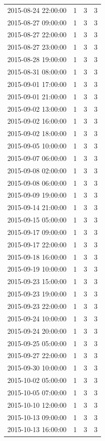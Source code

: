 \begin{tabular}{lrrr}
2015-08-24 22:00:00 & 1 & 3 & 3 \\
2015-08-27 09:00:00 & 1 & 3 & 3 \\
2015-08-27 22:00:00 & 1 & 3 & 3 \\
2015-08-27 23:00:00 & 1 & 3 & 3 \\
2015-08-28 19:00:00 & 1 & 3 & 3 \\
2015-08-31 08:00:00 & 1 & 3 & 3 \\
2015-09-01 17:00:00 & 1 & 3 & 3 \\
2015-09-01 21:00:00 & 1 & 3 & 3 \\
2015-09-02 13:00:00 & 1 & 3 & 3 \\
2015-09-02 16:00:00 & 1 & 3 & 3 \\
2015-09-02 18:00:00 & 1 & 3 & 3 \\
2015-09-05 10:00:00 & 1 & 3 & 3 \\
2015-09-07 06:00:00 & 1 & 3 & 3 \\
2015-09-08 02:00:00 & 1 & 3 & 3 \\
2015-09-08 06:00:00 & 1 & 3 & 3 \\
2015-09-09 19:00:00 & 1 & 3 & 3 \\
2015-09-14 21:00:00 & 1 & 3 & 3 \\
2015-09-15 05:00:00 & 1 & 3 & 3 \\
2015-09-17 09:00:00 & 1 & 3 & 3 \\
2015-09-17 22:00:00 & 1 & 3 & 3 \\
2015-09-18 16:00:00 & 1 & 3 & 3 \\
2015-09-19 10:00:00 & 1 & 3 & 3 \\
2015-09-23 15:00:00 & 1 & 3 & 3 \\
2015-09-23 19:00:00 & 1 & 3 & 3 \\
2015-09-23 22:00:00 & 1 & 3 & 3 \\
2015-09-24 10:00:00 & 1 & 3 & 3 \\
2015-09-24 20:00:00 & 1 & 3 & 3 \\
2015-09-25 05:00:00 & 1 & 3 & 3 \\
2015-09-27 22:00:00 & 1 & 3 & 3 \\
2015-09-30 10:00:00 & 1 & 3 & 3 \\
2015-10-02 05:00:00 & 1 & 3 & 3 \\
2015-10-05 07:00:00 & 1 & 3 & 3 \\
2015-10-10 12:00:00 & 1 & 3 & 3 \\
2015-10-13 09:00:00 & 1 & 3 & 3 \\
2015-10-13 16:00:00 & 1 & 3 & 3 \\

\end{tabular}
